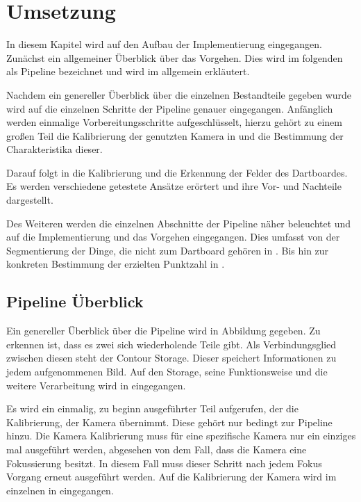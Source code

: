 
\chapter{Umsetzung}
\label{chap:coding}
In diesem Kapitel wird auf den Aufbau der Implementierung eingegangen. Zunächst ein allgemeiner Überblick über das Vorgehen. Dies wird im folgenden als Pipeline bezeichnet und wird im  allgemein erkläutert.

Nachdem ein genereller Überblick über die einzelnen Bestandteile gegeben wurde wird auf die einzelnen Schritte der Pipeline genauer eingegangen.
Anfänglich werden einmalige Vorbereitungsschritte aufgeschlüsselt, hierzu gehört zu einem großen Teil die Kalibrierung der genutzten Kamera in  und die Bestimmung der Charakteristika dieser. 

Darauf folgt in  die Kalibrierung und die Erkennung der Felder des Dartboardes. Es werden verschiedene getestete Ansätze erörtert und ihre Vor- und Nachteile dargestellt.

Des Weiteren werden die einzelnen Abschnitte der Pipeline näher beleuchtet und auf die Implementierung und das Vorgehen eingegangen. Dies umfasst von der Segmentierung der Dinge, die nicht zum Dartboard gehören in . Bis hin zur konkreten Bestimmung der erzielten Punktzahl in . 
       
\section{Pipeline Überblick}
\label{sec:pipeline}
Ein genereller Überblick über die Pipeline wird in Abbildung  gegeben. Zu erkennen ist, dass es zwei sich wiederholende Teile gibt. Als Verbindungsglied zwischen diesen steht der Contour Storage. Dieser speichert Informationen zu jedem aufgenommenen Bild. Auf den Storage, seine Funktionsweise und die weitere Verarbeitung wird in  eingegangen. 

Es wird ein einmalig, zu beginn ausgeführter Teil aufgerufen, der die Kalibrierung, der Kamera übernimmt. Diese gehört nur bedingt zur Pipeline hinzu. Die Kamera Kalibrierung muss für eine spezifische Kamera nur ein einziges mal ausgeführt werden, abgesehen von dem Fall, dass die Kamera eine Fokussierung besitzt. In diesem Fall muss dieser Schritt nach jedem Fokus Vorgang erneut ausgeführt werden. Auf die Kalibrierung der Kamera wird im einzelnen in  eingegangen.

